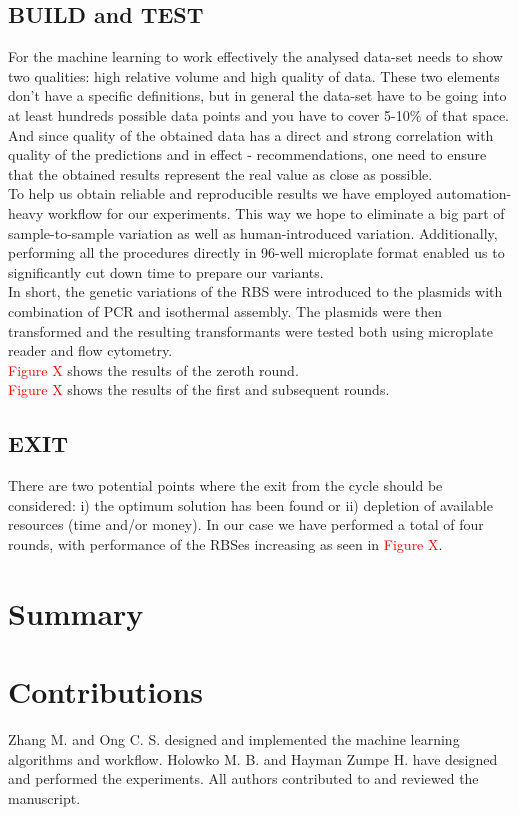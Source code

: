 \documentclass{article}
\begin{document}
\subsection{BUILD and TEST}

For the machine learning to work effectively the analysed data-set needs to show two qualities: high relative volume and high quality of data. These two elements don't have a specific definitions, but in general the data-set have to be going into at least hundreds possible data points and you have to cover 5-10\% of that space. And since quality of the obtained data has a direct and strong correlation with quality of the predictions and in effect - recommendations, one need to ensure that the obtained results represent the real value as close as possible.\\
To help us obtain reliable and reproducible results we have employed automation-heavy workflow for our experiments. This way we hope to eliminate a big part of sample-to-sample variation as well as human-introduced variation. Additionally, performing all the procedures directly in 96-well microplate format enabled us to significantly cut down time to prepare our variants.\\
In short, the genetic variations of the RBS were introduced to the plasmids with combination of PCR and isothermal assembly. The plasmids were then transformed and the resulting transformants were tested both using microplate reader and flow cytometry.\\
\textcolor{red}{Figure X} shows the results of the zeroth round.  \\


\textcolor{red}{Figure X} shows the results of the first and subsequent rounds.\\

\subsection{EXIT}
There are two potential points where the exit from the cycle should be considered: i) the optimum solution has been found or ii) depletion of available resources (time and/or money). In our case we have performed a total of four rounds, with performance of the RBSes increasing as seen in \textcolor{red}{Figure X}.\\


\section{Summary}

\section{Contributions}
Zhang M. and Ong C. S. designed and implemented the machine learning algorithms and workflow. Holowko M. B. and Hayman Zumpe H. have designed and performed the experiments. All authors contributed to and reviewed the manuscript.


\newpage

\printbibliography

\clearpage

\appendix

\end{document}
